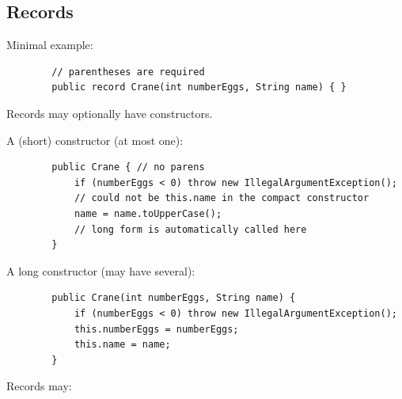 \documentclass{scrartcl}
\begin{document}
\subsection{Records}

    Minimal example:

    \begin{lstlisting}
        // parentheses are required
        public record Crane(int numberEggs, String name) { }
    \end{lstlisting}

    Records may optionally have constructors.

    A (short) constructor (at most one):

    \begin{lstlisting}
        public Crane { // no parens
            if (numberEggs < 0) throw new IllegalArgumentException();
            // could not be this.name in the compact constructor
            name = name.toUpperCase();
            // long form is automatically called here
        }
    \end{lstlisting}

    A long constructor (may have several):

    \begin{lstlisting}
        public Crane(int numberEggs, String name) {
            if (numberEggs < 0) throw new IllegalArgumentException();
            this.numberEggs = numberEggs;
            this.name = name;
        }
    \end{lstlisting}

    Records may:
\end{document}
